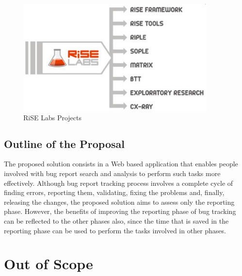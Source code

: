 \begin{figure}[htp]
\begin{center}
  \includegraphics[width=10cm]{chapters/introduction/rise-projects.png}
  \caption[RiSE Labs Projects]{RiSE Labs Projects}
  \label{fg:rise-projects}
\end{center}
\end{figure}

\subsection{Outline of the Proposal}
The proposed solution consists in a Web based application that enables people
involved with bug report search and analysis to perform such tasks
more effectively. Although bug report tracking process involves a complete
cycle of finding errors, reporting them, validating, fixing the problems and, finally,
releasing the changes, the proposed solution aims to assess only the reporting
phase. However, the benefits of improving the reporting phase of bug tracking
can be reflected to the other phases also, since the time that is saved
in the reporting phase can be used to perform the tasks involved in other
phases.

\section{Out of Scope}
\label{sc:outofscope}

